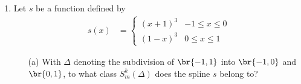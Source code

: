 \documentclass[11pt]{article}
\begin{document}
\begin{enumerate}
\begin{enumerate}
    \end{enumerate}

    \item %
        Let $s$ be a function defined by
        \begin{align*}
            s(x) &=
            \begin{cases}
                (x + 1)^3 & -1 \le x \le 0 \\
                (1 - x)^3 & 0 \le x \le 1
            \end{cases}
        \end{align*}
        \begin{enumerate}
            \item[(a)] %
                With $\Delta$ denoting the subdivision of $\br{-1,1}$ into
                $\br{-1, 0}$ and $\br{0, 1}$, to what class $S_m^k(\Delta)$
                does the spline $s$ belong to?


\end{enumerate}
\end{enumerate}
\end{document}
